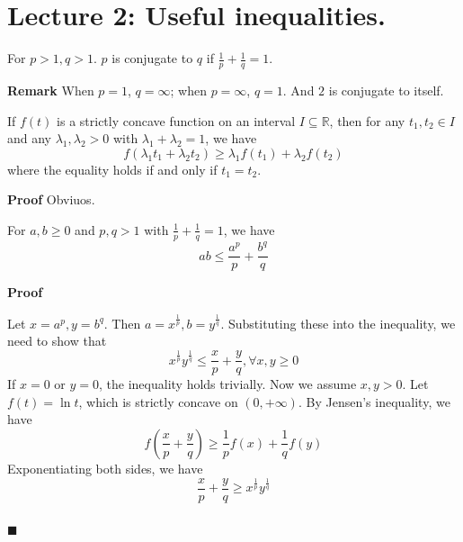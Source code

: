 \documentclass[main.tex]{subfiles}
\begin{document}
\pagestyle{plain}
\setcounter{chapter}{1}

\chapter{Lecture 2: Useful inequalities. }
\label{chap:chapter2}

\begin{definition}
    For $p>1, q>1$. $p$ is conjugate to $q$ if $\frac{1}{p} + \frac{1}{q} = 1$.
\end{definition}
\par \noindent \textbf{Remark} When $p = 1$, $q = \infty$; when $p = \infty$, $q = 1$. And $2$ is conjugate to itself. 

\begin{lemma}
    If $f(t)$ is a strictly concave function on an interval $I \subseteq \mathbb{R}$, then for any $t_1, t_2\in I$ and any $\lambda_1, \lambda_2 > 0$ with $\lambda_1 + \lambda_2 = 1$, we have
    \begin{equation}
        f(\lambda_1 t_1 + \lambda_2 t_2) \ge \lambda_1 f(t_1) + \lambda_2 f(t_2)
    \end{equation}
    where the equality holds if and only if $t_1 = t_2$.
\end{lemma}
\par \noindent \textbf{Proof} Obviuos. 

\begin{theorem}
    For $a, b \ge 0$ and $p, q > 1$ with $\frac{1}{p} + \frac{1}{q} = 1$, we have
    \begin{equation}
        ab \le \dfrac{a^p}{p} + \frac{b^q}{q}
    \end{equation}
\end{theorem}
\par \noindent \textbf{Proof} 
\par Let $x = a^p, y = b^q$. Then $a = x^{\frac{1}{p}}, b = y^{\frac{1}{q}}$. Substituting these into the inequality, we need to show that
\begin{equation}
    x^{\frac{1}{p}} y^{\frac{1}{q}} \le \dfrac{x}{p} + \dfrac{y}{q}, \forall x, y \ge 0
\end{equation}
If $x = 0$ or $y = 0$, the inequality holds trivially. Now we assume $x, y > 0$. Let $f(t) = \ln t$, which is strictly concave on $(0, +\infty)$. By Jensen's inequality, we have
\begin{equation}
    f\left( \dfrac{x}{p} + \dfrac{y}{q} \right) \ge \dfrac{1}{p} f(x) + \dfrac{1}{q} f(y) 
\end{equation}
Exponentiating both sides, we have
\begin{equation}
    \dfrac{x}{p} + \dfrac{y}{q} \ge x^{\frac{1}{p}} y^{\frac{1}{q}}
\end{equation}
\mbox{} \\ \null \hfill $\blacksquare$ 
\end{document}
